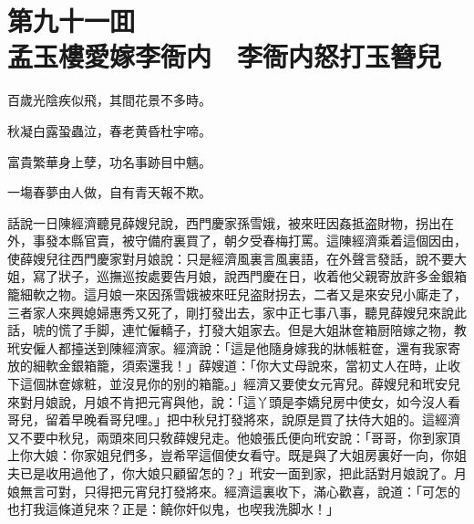 
\chapter*{第九十一囬　\\孟玉樓愛嫁李衙内　李衙内怒打玉簪兒}


\begin{myquote}
百歲光陰疾似飛，其間花景不多時。

秋凝白露蛩蟲泣，春老黄昏杜宇啼。

富貴繁華身上孽，功名事跡目中魑。

一塲春夢由人做，自有青天報不欺。
\end{myquote}

話說一日陳經濟聽見薛嫂兒說，西門慶家孫雪娥，被來旺因姦抵盗財物，拐出在外，事發本縣官賣，被守備府裏買了，朝夕受春梅打罵。這陳經濟乘着這個因由，使薛嫂兒往西門慶家對月娘說：只是經濟風裏言風裏語，在外聲言發話，說不要大姐，寫了狀子，巡撫巡按處要告月娘，說西門慶在日，收着他父親寄放許多金銀箱籠細軟之物。這月娘一來因孫雪娥被來旺兒盗財拐去，二者又是來安兒小廝走了，三者家人來興媳婦惠秀又死了，剛打發出去，家中正七事八事，聽見薛嫂兒來說此話，唬的慌了手脚，連忙僱轎子，打發大姐家去。但是大姐牀奩箱厨陪嫁之物，教玳安僱人都擡送到陳經濟家。經濟說：「這是他隨身嫁我的牀帳粧奩，還有我家寄放的細軟金銀箱籠，須索還我！」薛嫂道：「你大丈母說來，當初丈人在時，止收下這個牀奩嫁粧，並沒見你的别的箱籠。」經濟又要使女元宵兒。薛嫂兒和玳安兒來對月娘說，月娘不肯把元宵與他，說：「這丫頭是李嬌兒房中使女，如今沒人看哥兒，留着早晚看哥兒哩。」把中秋兒打發將來，說原是買了扶侍大姐的。這經濟又不要中秋兒，兩頭來囘只敎薛嫂兒走。他娘張氏便向玳安說：「哥哥，你到家頂上你大娘：你家姐兒們多，豈希罕這個使女看守。既是與了大姐房裏好一向，你姐夫已是收用過他了，你大娘只顧留怎的？」玳安一面到家，把此話對月娘說了。月娘無言可對，只得把元宵兒打發將來。經濟這裏收下，滿心歡喜，說道：「可怎的也打我這條道兒來？正是：饒你奸似鬼，也喫我洗脚水！」

